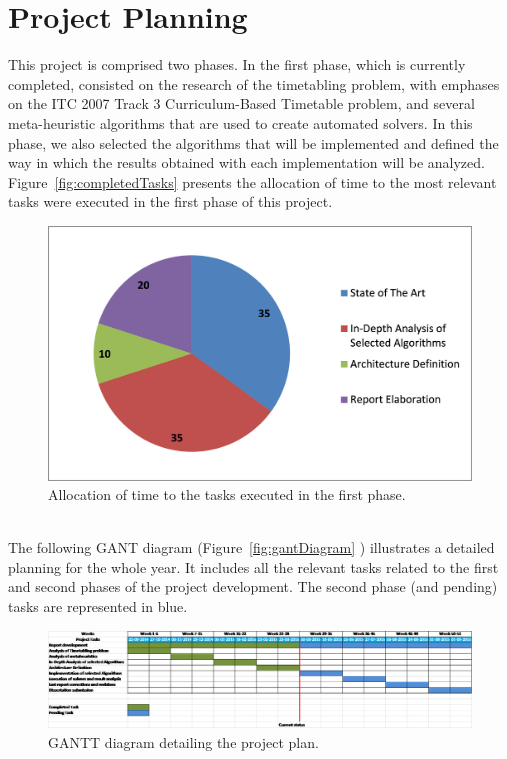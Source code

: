 \chapter{Project Planning}
\label{planning}
\thispagestyle{plain}

This project is comprised two phases. In the first phase, which is currently completed, consisted on the research of the timetabling problem, with emphases on the ITC 2007 Track 3 Curriculum-Based Timetable problem, and several meta-heuristic algorithms that are used to create automated solvers. In this phase, we also selected the algorithms that will be implemented and defined the way in which the results obtained with each implementation will be analyzed.\\
Figure~\ref{fig:completedTasks} presents the allocation of time to the most relevant tasks were executed in the first phase of this project.\\
\begin{figure}[h!]
 \centering
   \includegraphics[width=12.72cm]{./images/figures/Fig5_CompletedProjectTasks.png}
   \caption{Allocation of time to the tasks executed in the first phase.}
   \label{fig:ganttDiagram}
\end{figure}\\
The following GANT diagram (Figure~\ref{fig:gantDiagram} ) illustrates a detailed planning for the whole year. It includes all the relevant tasks related to the first and second phases of the project development. The second phase (and pending) tasks are represented in blue.\\
\begin{figure}[h!]
 \centering
   \hspace*{-3,3cm}
   \includegraphics[width=20cm]{./images/figures/Fig6_GANTT_Diagram.png}
   \caption{GANTT diagram detailing the project plan.}
   \label{fig:ganttDiagram}
\end{figure}\\
